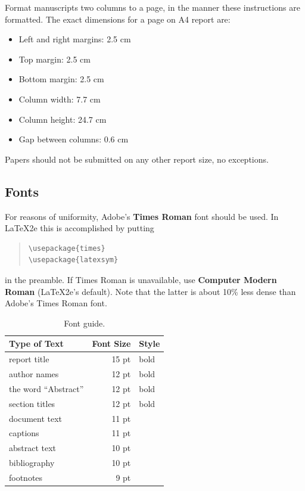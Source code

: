 \documentclass[11pt]{article}
\begin{document}
Format manuscripts two columns to a page, in the manner these
instructions are formatted. The exact dimensions for a page on A4
report are:

\begin{itemize}
\item Left and right margins: 2.5 cm
\item Top margin: 2.5 cm
\item Bottom margin: 2.5 cm
\item Column width: 7.7 cm
\item Column height: 24.7 cm
\item Gap between columns: 0.6 cm
\end{itemize}

\noindent Papers should not be submitted on any other report size, no exceptions.


\subsection{Fonts}

For reasons of uniformity, Adobe's {\bf Times Roman} font should be
used. In \LaTeX2e{} this is accomplished by putting

\begin{quote}
\begin{verbatim}
\usepackage{times}
\usepackage{latexsym}
\end{verbatim}
\end{quote}
in the preamble. If Times Roman is unavailable, use {\bf Computer
  Modern Roman} (\LaTeX2e{}'s default).  Note that the latter is about
  10\% less dense than Adobe's Times Roman font.


\begin{table}[h]
\begin{center}
\begin{tabular}{|l|rl|}
\hline \bf Type of Text & \bf Font Size & \bf Style \\ \hline
report title & 15 pt & bold \\
author names & 12 pt & bold \\
the word ``Abstract'' & 12 pt & bold \\
section titles & 12 pt & bold \\
document text & 11 pt  &\\
captions & 11 pt & \\
abstract text & 10 pt & \\
bibliography & 10 pt & \\
footnotes & 9 pt & \\
\hline
\end{tabular}
\end{center}
\caption{\label{font-table} Font guide.}
\end{table}
\end{document}
